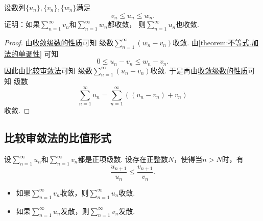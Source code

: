 \begin{example}
设数列\(\{u_n\},\{v_n\},\{w_n\}\)满足\[
	v_n \leq u_n \leq w_n.
\]
证明：如果\(\sum_{n=1}^\infty v_n\)和\(\sum_{n=1}^\infty w_n\)都收敛，
则\(\sum_{n=1}^\infty u_n\)也收敛.
\begin{proof}
由\hyperref[theorem:无穷级数.收敛级数性质2]{收敛级数的性质}可知
级数\(\sum_{n=1}^\infty (w_n - v_n)\)收敛.
由\cref{theorem:不等式.加法的单调性} 可知\[
	0 \leq u_n - v_n \leq w_n - v_n.
\]
因此由\hyperref[theorem:无穷级数.正项级数的比较审敛法]{比较审敛法}可知
级数\(\sum_{n=1}^\infty (u_n - v_n)\)收敛.
于是再由\hyperref[theorem:无穷级数.收敛级数性质2]{收敛级数的性质}可知
级数\[
	\sum_{n=1}^\infty u_n
	= \sum_{n=1}^\infty ((u_n - v_n) + v_n)
\]收敛.
\end{proof}
\end{example}

\subsection{比较审敛法的比值形式}
\begin{theorem}\label{theorem:无穷级数.比较审敛法的比值形式}
设\(\sum_{n=1}^\infty u_n\)和\(\sum_{n=1}^\infty v_n\)都是正项级数.
设存在正整数\(N\)，使得当\(n>N\)时，有\[
	\frac{u_{n+1}}{u_n} \leq \frac{v_{n+1}}{v_n}.
\]
\begin{itemize}
	\item 如果\(\sum_{n=1}^\infty v_n\)收敛，则\(\sum_{n=1}^\infty u_n\)收敛.
	\item 如果\(\sum_{n=1}^\infty u_n\)发散，则\(\sum_{n=1}^\infty v_n\)发散.
\end{itemize}
\end{theorem}

